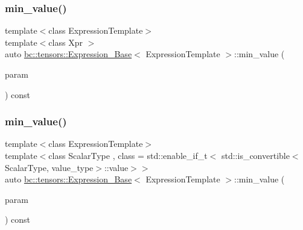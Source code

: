 \subsubsection{\texorpdfstring{min\+\_\+value()}{min\_value()}\hspace{0.1cm}{\footnotesize\ttfamily [1/2]}}
{\footnotesize\ttfamily template$<$class Expression\+Template$>$ \\
template$<$class Xpr $>$ \\
auto \hyperlink{classbc_1_1tensors_1_1Expression__Base}{bc\+::tensors\+::\+Expression\+\_\+\+Base}$<$ Expression\+Template $>$\+::min\+\_\+value (\begin{DoxyParamCaption}\item[{const \hyperlink{classbc_1_1tensors_1_1Expression__Base}{Expression\+\_\+\+Base}$<$ Xpr $>$ \&}]{param }\end{DoxyParamCaption}) const\hspace{0.3cm}{\ttfamily [inline]}}

\mbox{\label{classbc_1_1tensors_1_1Expression__Base_a551cca2012d1b33ad23d6250d24edec9}} 
\subsubsection{\texorpdfstring{min\+\_\+value()}{min\_value()}\hspace{0.1cm}{\footnotesize\ttfamily [2/2]}}
{\footnotesize\ttfamily template$<$class Expression\+Template$>$ \\
template$<$class Scalar\+Type , class  = std\+::enable\+\_\+if\+\_\+t$<$   std\+::is\+\_\+convertible$<$\+Scalar\+Type, value\+\_\+type$>$\+::value$>$$>$ \\
auto \hyperlink{classbc_1_1tensors_1_1Expression__Base}{bc\+::tensors\+::\+Expression\+\_\+\+Base}$<$ Expression\+Template $>$\+::min\+\_\+value (\begin{DoxyParamCaption}\item[{const Scalar\+Type \&}]{param }\end{DoxyParamCaption}) const\hspace{0.3cm}{\ttfamily [inline]}}

\mbox{\label{classbc_1_1tensors_1_1Expression__Base_a35bbc1902bc3234e6cb7a906302cae55}} 
